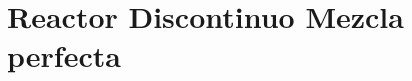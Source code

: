 \documentclass{report}
\begin{document}
\chapter{Reactor Discontinuo Mezcla perfecta}



\end{document}
